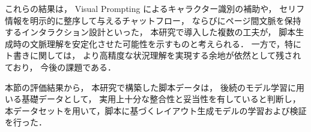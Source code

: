 \documentclass[a4j,12pt]{jsreport}
\begin{document}
これらの結果は，
Visual Prompting によるキャラクター識別の補助や，
セリフ情報を明示的に整序して与えるチャットフロー，
ならびにページ間文脈を保持するインタラクション設計といった，
本研究で導入した複数の工夫が，
脚本生成時の文脈理解を安定化させた可能性を示すものと考えられる．
一方で，特にト書きに関しては，
より高精度な状況理解を実現する余地が依然として残されており，
今後の課題である．

本節の評価結果から，
本研究で構築した脚本データは，
後続のモデル学習に用いる基礎データとして，
実用上十分な整合性と妥当性を有していると判断し，
本データセットを用いて，脚本に基づくレイアウト生成モデルの学習および検証を行った．

\ifdefined\ismain\else
   \printbibliography[title=参考文献]
\fi
\end{document}
